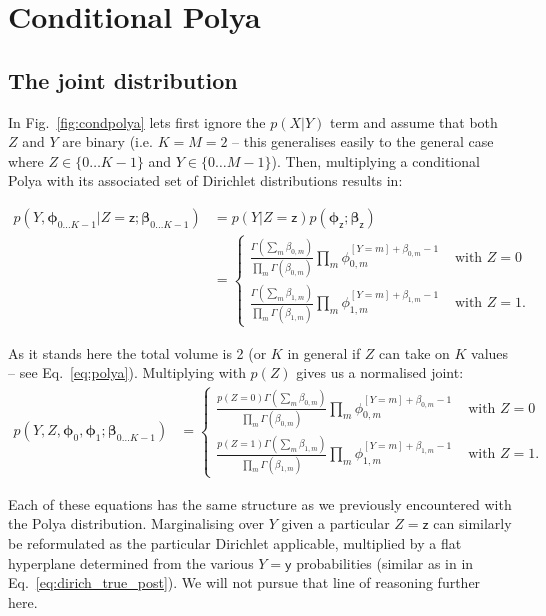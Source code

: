 \documentclass[oneside,english]{scrbook}
\begin{document}
\chapter{Conditional Polya}

\section{The joint distribution}

In Fig.~\ref{fig:condpolya} lets first ignore the $p(X|Y)$ term and
assume that both $Z$ and $Y$ are binary (i.e. $K=M=2$ -- this
generalises easily to the general case where $Z\in\{0\ldots{K-1}\}$
and $Y\in\{0\ldots{M-1}\}$). Then, multiplying a conditional Polya
with its associated set of Dirichlet distributions results in:

\begin{align*}
  p(Y,\bm{\phi}_{0\dots K-1}|Z=\mathsf{z};\bm{\beta}_{0\ldots K-1})
  &= p(Y|Z=\mathsf{z}) p(\bm{\phi}_{\mathsf{z}};\bm{\beta}_{\mathsf{z}}) \\
  &= \left\{
  \begin{array}{lr}
    \frac{\Gamma(\sum_m\beta_{0,m}) }{\prod_{m}\Gamma(\beta_{0,m})} \prod_m\phi_{0,m}^{[Y=m]+\beta_{0,m}-1} & \mbox{ with } Z=0\\[3mm]
    \frac{\Gamma(\sum_m\beta_{1,m}) }{\prod_{m}\Gamma(\beta_{1,m})} \prod_m\phi_{1,m}^{[Y=m]+\beta_{1,m}-1}  & \mbox{ with } Z=1.
\end{array}
\right.
\end{align*}

As it stands here the total volume is 2 (or $K$ in general if $Z$ can
take on $K$ values -- see Eq.~\ref{eq:polya}). Multiplying with $p(Z)$ gives us a normalised %
joint:
\begin{align}
  p(Y,Z,\bm{\phi}_0,\bm{\phi}_1;\bm{\beta}_{0\ldots K-1}) &= \left\{
    \begin{array}{lr}
    \frac{p(Z=0)\Gamma(\sum_m\beta_{0,m}) }{\prod_{m}\Gamma(\beta_{0,m})} \prod_m\phi_{0,m}^{[Y=m]+\beta_{0,m}-1} & \mbox{ with } Z=0\\[3mm]
    \frac{p(Z=1)\Gamma(\sum_m\beta_{1,m}) }{\prod_{m}\Gamma(\beta_{1,m})} \prod_m\phi_{1,m}^{[Y=m]+\beta_{1,m}-1}  & \mbox{ with } Z=1.
\end{array}
\right.
\end{align}

Each of these equations has the same structure as we previously
encountered with the Polya distribution. Marginalising over $Y$ given
a particular $Z=\mathsf{z}$ can similarly be reformulated as the
particular Dirichlet applicable, multiplied by a flat hyperplane
determined from the various $Y=\mathsf{y}$ probabilities (similar as
in in Eq.~\ref{eq:dirich_true_post}). We will not pursue that line of
reasoning further here.
\end{document}

